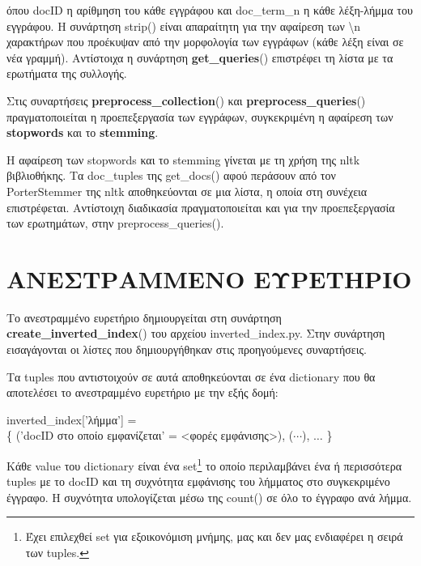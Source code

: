 ﻿\documentclass[12pt]{report}
\begin{document}
            \noindent όπου {\fontCode\small docID} η αρίθμηση του κάθε εγγράφου και {\fontCode\small doc\_term\_n} η κάθε λέξη-λήμμα του εγγράφου.
            Η συνάρτηση {\fontCode\small strip()} είναι απαραίτητη για την αφαίρεση των {\fontCode\small \textbackslash n} χαρακτήρων
            που προέκυψαν από την μορφολογία των εγγράφων (κάθε λέξη είναι σε νέα γραμμή).
            Αντίστοιχα η συνάρτηση {\fontCode\small \textbf{get\_queries}()} επιστρέφει τη λίστα με τα ερωτήματα της συλλογής.

            Στις συναρτήσεις {\fontCode\small \textbf{preprocess\_collection}()} και {\fontCode\small \textbf{preprocess\_queries}()}
            πραγματοποιείται η προεπεξεργασία των εγγράφων, συγκεκριμένη η αφαίρεση των \textbf{stopwords} και το \textbf{stemming}.


            Η αφαίρεση των stopwords και το stemming γίνεται με τη χρήση της {\fontCode\small nltk} βιβλιοθήκης. Τα {\fontCode\small doc\_tuples} της
            {\fontCode\small get\_docs()} αφού περάσουν από τον {\fontCode\small PorterStemmer} της {\fontCode\small nltk} αποθηκεύονται σε μια λίστα,
            η οποία στη συνέχεια επιστρέφεται.
            Αντίστοιχη διαδικασία πραγματοποιείται και για την προεπεξεργασία των ερωτημάτων, στην {\fontCode\small preprocess\_queries()}.

        \section{ΑΝΕΣΤΡΑΜΜΕΝΟ ΕΥΡΕΤΗΡΙΟ}

            Το ανεστραμμένο ευρετήριο δημιουργείται στη συνάρτηση {\fontCode\small \textbf{create\_inverted\_index}()} του αρχείου {\fontCode\small inverted\_index.py}.
            Στην συνάρτηση εισαγάγονται οι λίστες που δημιουργήθηκαν στις προηγούμενες συναρτήσεις.

            Τα tuples που αντιστοιχούν σε αυτά αποθηκεύονται σε ένα dictionary που θα αποτελέσει το ανεστραμμένο ευρετήριο με την εξής δομή:

                \begin{graycomment} \centering
                    {\fontCode\footnotesize inverted\_index['λήμμα'] = \\ \{ ('docID στο οποίο εμφανίζεται' = <φορές εμφάνισης>), (\(\cdots\)), \(\ldots\) \}}
                \end{graycomment}

            Κάθε value του dictionary είναι ένα set\footnote{Έχει επιλεχθεί set για εξοικονόμιση μνήμης, μας και δεν μας ενδιαφέρει η σειρά των tuples.} το οποίο περιλαμβάνει ένα ή περισσότερα tuples
            με το {\fontCode\small docID} και τη συχνότητα εμφάνισης του λήμματος στο συγκεκριμένο έγγραφο.
            Η συχνότητα υπολογίζεται μέσω της {\fontCode\small count()} σε όλο το έγγραφο ανά λήμμα.
\end{document}
